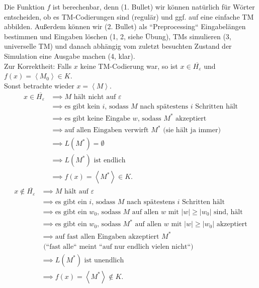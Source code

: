 \documentclass[11pt,a4paper]{article}
\begin{document}
Die Funktion \( f \) ist berechenbar, denn (1. Bullet) wir können nat\"urlich f\"ur W\"orter entscheiden, ob es TM-Codierungen sind (regul\"ar) und {ggf.} auf eine einfache TM abbilden. Au\ss erdem können wir (2. Bullet) als ``Preprocessing`` Eingabel\"angen bestimmen und Eingaben l\"oschen (1, 2, siehe \"Ubung), TMs simulieren (3, universelle TM) und danach abh\"angig vom zuletzt besuchten Zustand der Simulation eine Ausgabe machen (4, klar).\\
Zur Korrektheit: Falls \( x \) keine TM-Codierung war, so ist \( x \in \overline{H_\varepsilon} \) und \( f(x) = \left\langle M_0 \right\rangle \in K \).\\ Sonst betrachte wieder \( x = \left\langle M \right\rangle \).
\begin{align*}
	x \in \overline{H_\varepsilon} &\implies M \text{ h\"alt nicht auf } \varepsilon\\
		&\implies \text{es gibt kein } i \text{, sodass } M \text{ nach sp\"atestens } i \text{ Schritten h\"alt}\\
		&\implies \text{es gibt keine Eingabe } w \text{, sodass } M^\ast \text{ akzeptiert}\\
		&\implies \text{auf allen Eingaben verwirft } M^\ast \text{ (sie h\"alt ja immer)} \\
		&\implies L(M^\ast) = \emptyset\\
		&\implies L(M^\ast) \text{ ist endlich}\\
		&\implies f(x) = \left\langle M^\ast \right\rangle \in K.
\end{align*}
\begin{align*}
	x \notin \overline{H_\varepsilon} &\implies M \text{ h\"alt auf } \varepsilon\\
		&\implies \text{es gibt ein } i \text{, sodass } M \text{ nach sp\"atestens } i \text{ Schritten h\"alt}\\
		&\implies \text{es gibt ein } w_0 \text{, sodass } M \text{ auf allen } w \text{ mit } \left| w \right| \geq \left| w_0 \right| \text{ sind, h\"alt}\\
		&\implies \text{es gibt ein } w_0 \text{, sodass } M^\ast \text{ auf allen } w \text{ mit } \left| w \right| \geq \left| w_0 \right| \text{ akzeptiert}\\
		&\implies \text{auf fast allen Eingaben akzeptiert } M^\ast\\
		&\text{ (``fast alle`` meint ``auf nur endlich vielen nicht``)} \\
		&\implies L(M^\ast) \text{ ist unendlich}\\
		&\implies f(x) = \left\langle M^\ast \right\rangle \notin K.
\end{align*}
\end{document}
